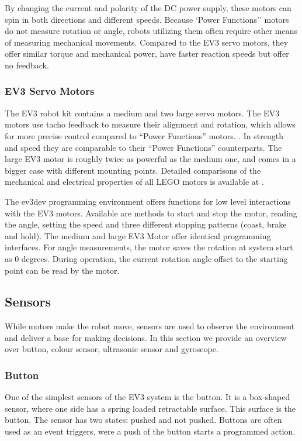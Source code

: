 \documentclass[11pt, a4paper]{article}
\begin{document}
By changing the current and polarity of the DC power supply, these motors can spin in both directions and different speeds. Because `Power Functions'' motors do not measure rotation or angle, robots utilizing them often require other means of measuring mechanical movements. Compared to the EV3 servo motors, they offer similar torque and mechanical power, have faster reaction speeds but offer no feedback. \cite{motor_comparison}


\subsubsection*{EV3 Servo Motors}
The EV3 robot kit contains a medium and two large servo motors. The EV3 motors use tacho feedback to measure their alignment and rotation, which allows for more precise control compared to ``Power Functions'' motors. \cite{Servo_Motor}. In strength and speed they are comparable to their ``Power Functions'' counterparts. The large EV3 motor is roughly twice as powerful as the medium one, and comes in a bigger case with different mounting points. Detailed comparisons of the mechanical and electrical properties of all LEGO motors is available at \cite{motor_comparison}.

The ev3dev programming environment offers functions for low level interactions with the EV3 motors. Available are methods to start and stop the motor, reading the angle, setting the speed and three different stopping patterns (coast, brake and hold). The medium and large EV3 Motor offer identical programming interfaces. For angle measurements, the motor saves the rotation at system start as 0 degrees. During operation, the current rotation angle offset to the starting point can be read by the motor. \cite{ev3_python}

\subsection{Sensors}
While motors make the robot move, sensors are used to observe the environment and deliver a base for making decisions. In this section we provide an overview over button, colour sensor, ultrasonic sensor and gyroscope.

\subsubsection*{Button}
One of the simplest sensors of the EV3 system is the button. It is a box-shaped sensor, where one side has a spring loaded retractable surface. This surface is the button. The sensor has two states: pushed and not pushed. Buttons are often used as an event triggers, were a push of the button starts a programmed action.
\end{document}
